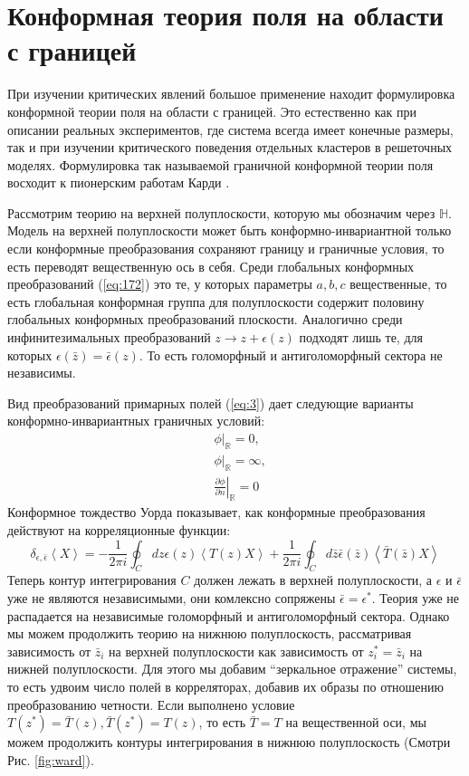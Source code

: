\section{Конформная теория поля на области с границей}
\label{sec:boundary-cft}



При изучении критических явлений большое применение находит формулировка конформной теории поля на области с границей. Это естественно как при описании реальных экспериментов, где система всегда имеет конечные размеры, так и при изучении критического поведения отдельных кластеров в решеточных моделях. Формулировка так называемой граничной конформной теории поля восходит к пионерским работам Карди \cite{cardy1984conformal,cardy1989boundary,cardy1986effect}. 

Рассмотрим теорию на верхней полуплоскости, которую мы обозначим через $\mathbb{H}$. Модель на верхней полуплоскости может быть конформно-инвариантной только если конформные преобразования сохраняют границу и граничные условия, то есть переводят вещественную ось в себя. Среди глобальных конформных преобразований (\ref{eq:172}) это те, у которых параметры $a,b,c$ вещественные, то есть глобальная конформная группа для полуплоскости содержит половину глобальных конформных преобразований плоскости. Аналогично среди инфинитезимальных преобразований $z\to z+\epsilon(z)$ подходят лишь те, для которых $\epsilon(\bar z)=\bar \epsilon(z)$. То есть голоморфный и антиголоморфный сектора не независимы. 

Вид преобразований примарных полей (\ref{eq:3}) дает следующие варианты конформно-инвариантных граничных условий:
\begin{eqnarray}
  \label{eq:173}
 & \phi |_{\mathbb{R}}=0,\\
 & \phi |_{\mathbb{R}}=\infty,\\
 & \left. \frac{\partial \phi}{\partial n}\right|_{\mathbb{R}}=0
\end{eqnarray}
Конформное тождество Уорда показывает, как конформные преобразования действуют на корреляционные функции:
\begin{equation}
  \label{eq:174}
  \delta_{\epsilon,\bar \epsilon} \left< X\right> = -\frac{1}{2\pi i} \oint_C dz \epsilon(z) \left< T(z) X\right> +\frac{1}{2\pi i}\oint_C d\bar z \bar \epsilon(\bar z) \left< \bar T(\bar z) X\right> 
\end{equation}
Теперь контур интегрирования $C$ должен лежать в  верхней полуплоскости, а  $\epsilon$ и $\bar \epsilon$ уже не являются независимыми, они комлексно сопряжены $\bar \epsilon=\epsilon^{*}$. Теория уже не распадается на независимые голоморфный и антиголоморфный сектора. Однако мы можем продолжить теорию на нижнюю полуплоскость, рассматривая зависимость от $\bar z_{i}$ на верхней полуплоскости как зависимость от $z_{i}^{*}=\bar z_{i}$ на нижней полуплоскости.  Для этого мы добавим ``зеркальное отражение'' системы, то есть удвоим число полей в корреляторах, добавив их образы по отношению преобразованию четности. Если выполнено условие $T(z^{*})=\bar T(z), \bar T(z^{*})=T(z)$, то есть $\bar T=T$ на вещественной оси, мы можем продолжить контуры интегрирования в нижнюю полуплоскость (Смотри Рис. \ref{fig:ward}). 

